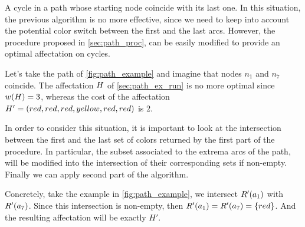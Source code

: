 A cycle in a path whose starting node coincide with its last one.
In this situation, the previous algorithm is no more effective, since we need to keep into account the potential color switch between the first and the last arcs.
However, the procedure proposed in \cref{sec:path_proc}, can be easily modified to provide an optimal affectation on cycles.

Let's take the path of \cref{fig:path_example} and imagine that nodes $n_1$ and $n_7$ coincide.
The affectation $H$ of \cref{sec:path_ex_run} is no more optimal since $w(H) = 3$, whereas the cost of the affectation $H' = (red, red, red, yellow, red, red)$ is $2$.

In order to consider this situation, it is important to look at the intersection between the first and the last set of colors returned by the first part of the procedure. In particular, the subset associated to the extrema arcs of the path, will be modified into the intersection of their corresponding sets if non-empty. Finally we can apply second part of the algorithm.

Concretely, take the example in \cref{fig:path_example}, we intersect $R'(a_1)$ with $R'(a_7)$. Since this intersection is non-empty, then $R'(a_1) = R'(a_7) = \{red\}$. And the resulting affectation will be exactly $H'$.

